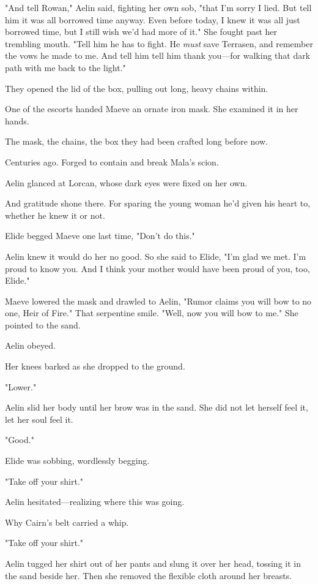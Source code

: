 "And tell Rowan," Aelin said, fighting her own sob, "that I'm sorry I lied. But tell him it was all borrowed time anyway. Even before today, I knew it was all just borrowed time, but I still wish we'd had more of it." She fought past her trembling mouth. "Tell him he has to fight. He \emph{must} save Terrasen, and remember the vows he made to me. And tell him  tell him thank you---for walking that dark path with me back to the light."

They opened the lid of the box, pulling out long, heavy chains within.

One of the escorts handed Maeve an ornate iron mask. She examined it in her hands.

The mask, the chains, the box  they had been crafted long before now.

Centuries ago. Forged to contain and break Mala's scion.

Aelin glanced at Lorcan, whose dark eyes were fixed on her own.

And gratitude shone there. For sparing the young woman he'd given his heart to, whether he knew it or not.

Elide begged Maeve one last time, "Don't do this."

Aelin knew it would do her no good. So she said to Elide, "I'm glad we met. I'm proud to know you. And I think your mother would have been proud of you, too, Elide."

Maeve lowered the mask and drawled to Aelin, "Rumor claims you will bow to no one, Heir of Fire." That serpentine smile. "Well, now you will bow to me." She pointed to the sand.

Aelin obeyed.

Her knees barked as she dropped to the ground.

"Lower."

Aelin slid her body until her brow was in the sand. She did not let herself feel it, let her soul feel it.

"Good."

Elide was sobbing, wordlessly begging.

"Take off your shirt."

Aelin hesitated---realizing where this was going.

Why Cairn's belt carried a whip.

"Take off your shirt."

Aelin tugged her shirt out of her pants and slung it over her head, tossing it in the sand beside her. Then she removed the flexible cloth around her breasts.

